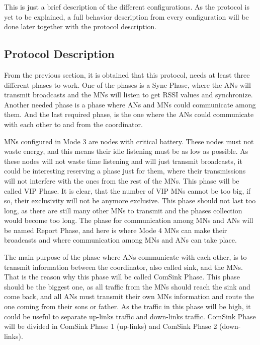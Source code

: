 This is just a brief description of the different configurations. As the protocol is yet to be explained, a full behavior description from 
every configuration will be done later together with the protocol description.

\subsection{Protocol Description}

From the previous section, it is obtained that this protocol, needs at least three different phases to work. One of the phases is a Sync 
Phase, where the \acp{AN} will transmit broadcasts and the \acp{MN} will listen to get \ac{RSSI} values and synchronize. Another needed 
phase is a phase where \acp{AN} and \acp{MN} could communicate among them. And the last required phase, is the one where the \acp{AN} could 
communicate with each other to and from the coordinator.

\acp{MN} configured in Mode 3 are nodes with critical battery. These nodes must not waste energy, and this means their idle listening must be
as low as possible. As these nodes will not waste time listening and will just transmit broadcasts, it could be interesting reserving a phase
just for them, where their transmissions will not interfere with the ones from the rest of the \acp{MN}. This phase will be called \ac{VIP} 
Phase. It is clear, that the number of \ac{VIP} \acp{MN} cannot be too big, if so, their exclusivity will not be anymore exclusive.
This phase should not last too long, as there are still many other \acp{MN} to transmit and the phases collection would become too long.
The phase for communication among \acp{MN} and \acp{AN} will be named Report Phase, and here is where Mode 4 \acp{MN} can make 
their broadcasts and where communication among \acp{MN} and \acp{AN} can take place.

The main purpose of the phase where \acp{AN} communicate with each other, is to transmit information between the coordinator, also called sink, and 
the \acp{MN}. That is the reason why this phase will be called ComSink Phase. This phase should be the biggest one, as all traffic from 
the \acp{MN} should reach the sink and come back, and all \acp{AN} must transmit their own \acp{MN} information and route the one coming from
their sons or father. As the traffic in this phase will be high, it could be useful to separate up-links traffic and down-links traffic. 
ComSink Phase will be divided in ComSink Phase 1 (up-links) and ComSink Phase 2 (down-links).

